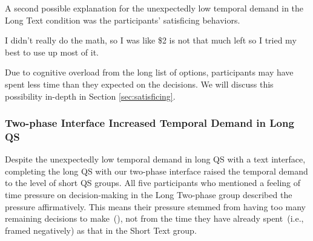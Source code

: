 A second possible explanation for the unexpectedly low temporal demand in the Long Text condition was the participants' satisficing behaviors. 

\begin{displayquote}
I didn't really do the math, so I was like \$2 is not that much left so I tried my best to use up most of it. \\\hfill{}
\end{displayquote}

Due to cognitive overload from the long list of options, participants may have spent less time than they expected on the decisions. We will discuss this possibility in-depth in Section \ref{sec:satisficing}.

\subsubsection{Two-phase Interface Increased Temporal Demand in Long QS} Despite the unexpectedly low temporal demand in long QS with a text interface, completing the long QS with our two-phase interface raised the temporal demand to the level of short QS groups. All five participants who mentioned a feeling of time pressure on decision-making in the Long Two-phase group described the pressure affirmatively. This means their pressure stemmed from having too many remaining decisions to make~(), not from the time they have already spent~(i.e., framed negatively) as that in the Short Text group. 


